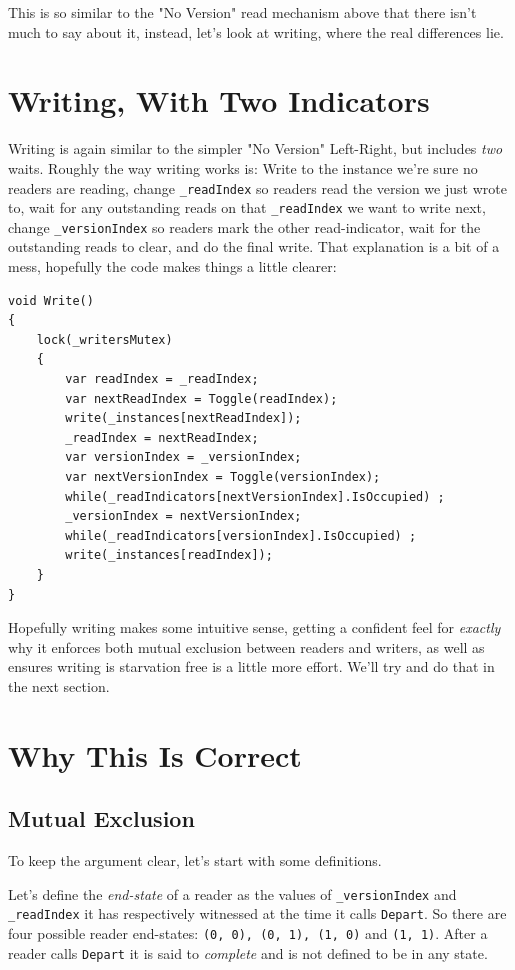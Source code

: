 \documentclass[11pt]{article}
\begin{document}
This is so similar to the "No Version" read mechanism above that there isn't much to say about it, instead, let's look at writing, where the real differences lie.

\section{Writing, With Two Indicators}

Writing is again similar to the simpler "No Version" Left-Right, but includes \emph{two} waits. Roughly the way writing works is: Write to the instance we're sure no readers are reading, change \texttt{\_readIndex} so readers read the version we just wrote to, wait for any outstanding reads on that \texttt{\_readIndex} we want to write next, change \texttt{\_versionIndex} so readers mark the other read-indicator, wait for the outstanding reads to clear, and do the final write. That explanation is a bit of a mess, hopefully the code makes things a little clearer:

\begin{verbatim}
void Write()
{
    lock(_writersMutex)
    {
        var readIndex = _readIndex;
        var nextReadIndex = Toggle(readIndex);
        write(_instances[nextReadIndex]);
        _readIndex = nextReadIndex;
        var versionIndex = _versionIndex;
        var nextVersionIndex = Toggle(versionIndex);
        while(_readIndicators[nextVersionIndex].IsOccupied) ;
        _versionIndex = nextVersionIndex;
        while(_readIndicators[versionIndex].IsOccupied) ;
        write(_instances[readIndex]);
    }
}
\end{verbatim}

Hopefully writing makes some intuitive sense, getting a confident feel for \emph{exactly} why it enforces both mutual exclusion between readers and writers, as well as ensures writing is starvation free is a little more effort. We'll try and do that in the next section.

\section{Why This Is Correct}

\subsection{Mutual Exclusion}

To keep the argument clear, let's start with some definitions.

Let's define the \emph{end-state} of a reader as the values of \texttt{\_versionIndex} and \texttt{\_readIndex} it has respectively witnessed at the time it calls \texttt{Depart}. So there are four possible reader end-states: \texttt{(0, 0), (0, 1), (1, 0)} and \texttt{(1, 1)}. After a reader calls \texttt{Depart} it is said to \emph{complete} and is not defined to be in any state.
\end{document}
